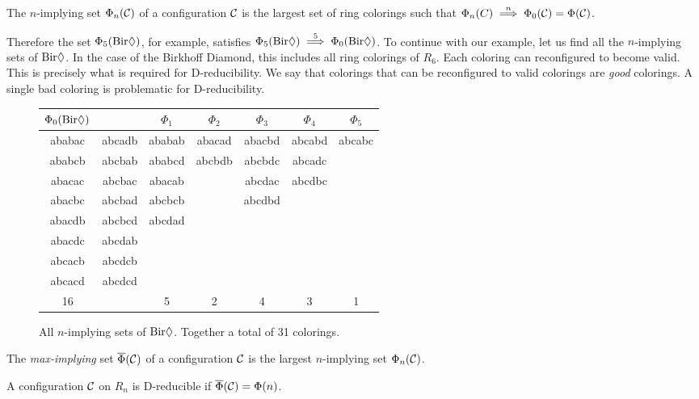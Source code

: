 \begin{definition}
    The $n$-implying set $\Phi_n(\mathcal{C})$ of a configuration $\mathcal{C}$ is the largest set of ring colorings such that $\Phi_n(C) \stackrel{n}{\implies} \Phi_0(\mathcal{C}) = \Phi(\mathcal{C})$. 
\end{definition}

Therefore the set $\Phi_5(\text{Bir}\Diamond)$, for example, satisfies $\Phi_5(\text{Bir}\Diamond) \stackrel{5}{\implies} \Phi_0(\text{Bir}\Diamond)$. To continue with our example, let us find all the $n$-implying sets of $\text{Bir}\Diamond$. In the case of the Birkhoff Diamond, this includes all ring colorings of $R_6$. Each coloring can reconfigured to become valid. This is precisely what is required for D-reducibility. We say that colorings that can be reconfigured to valid colorings are \textit{good} colorings. A single bad coloring is problematic for D-reducibility.

\needspace{2cm}
\begin{figure}[!ht]
    \centering
    \begin{tabular}{ ccccccc }
        $\Phi_0(\text{Bir}\Diamond) $ & & $\Phi_1$ & $\Phi_2$ & $\Phi_3$ & $\Phi_4$ & $\Phi_5$ \\
        \hline
        ababac & abcadb & ababab & abacad & abacbd & abcabd & abcabc \\
        ababcb & abcbab & ababcd & abcbdb & abcbdc & abcadc & \\
        abacac & abcbac & abacab &        & abcdac & abcdbc & \\
        abacbc & abcbad & abcbcb &        & abcdbd &        & \\
        abacdb & abcbcd & abcdad &        &        &        & \\
        abacdc & abcdab \\
        abcacb & abcdcb \\
        abcacd & abcdcd \\
        \hline
        16 & & 5 & 2 & 4 & 3 & 1 \\
    \end{tabular}
    \caption{ All $n$-implying sets of $\text{Bir}\Diamond$. Together a total of 31 colorings. }
    \label{table:diamondmap}
\end{figure}

\begin{definition}
    The \emph{max-implying} set $\overline{\Phi}(\mathcal{C})$ of a configuration $\mathcal{C}$ is the largest $n$-implying set  $\Phi_n(\mathcal{C})$.
\end{definition}

\begin{definition}
    A configuration $\mathcal{C}$ on $R_n$ is D-reducible if $\overline{\Phi}(\mathcal{C}) = \Phi(n)$.
\end{definition}

